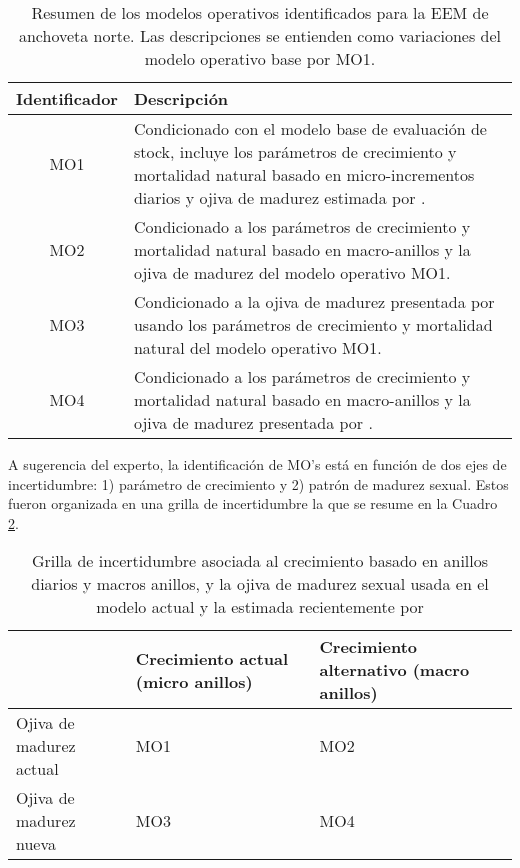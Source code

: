 \begin{table}[H] 
    \caption{Resumen de los modelos operativos identificados para la EEM de anchoveta norte. Las descripciones se entienden como variaciones del modelo operativo base por MO1.} 
    \label{tabla:MO}
    \begin{tabular}{cp{12cm}}
    \hline \hline
    \textbf{Identificador} & \textbf{Descripción} \\
    \hline \hline
    MO1 & Condicionado con el modelo base de evaluación de stock, incluye los parámetros de crecimiento y mortalidad natural basado en micro-incrementos diarios \citep{cerna2016daily} y ojiva de madurez estimada por \cite{martinez2009}.\\
    \hline
    MO2 & Condicionado a los parámetros de crecimiento y mortalidad natural basado en macro-anillos \citep{serra2013,plaza2012} y la ojiva de madurez del modelo operativo MO1. \\
    \hline
    MO3 & Condicionado a la ojiva de madurez presentada por \cite{Hernandez2023} usando los parámetros de crecimiento y mortalidad natural del modelo operativo MO1.\\
    \hline
    MO4 & Condicionado a los parámetros de crecimiento y mortalidad natural basado en macro-anillos \citep{serra2013,plaza2012} y la ojiva de madurez presentada por \cite{Hernandez2023}. \\ 
    \hline \hline
    \end{tabular}
\end{table}

A sugerencia del experto, la identificación de MO’s está en función de dos ejes de incertidumbre: 1) parámetro de crecimiento y 2) patrón de madurez sexual. Estos fueron organizada en una grilla de incertidumbre la que se resume en la Cuadro \ref{tab:tabla2}. 


\begin{table}[h]
    \centering
    \caption{Grilla de incertidumbre asociada al crecimiento basado en anillos diarios y macros anillos, y la ojiva de madurez sexual usada en el modelo actual y la estimada recientemente por \cite{Hernandez2023}}
    \label{tab:tabla2}
    \begin{tabular}{|p{4.5cm}|p{3cm}|p{3cm}|}
        \hline
         & \textbf{Crecimiento actual
         (micro anillos)}
          &\textbf{Crecimiento alternativo
          (macro anillos)}
           \\
        \hline
        Ojiva de madurez actual & MO1 & MO2\\
        \hline
        Ojiva de madurez nueva & MO3 & MO4\\
        \hline
    \end{tabular}
\end{table}

